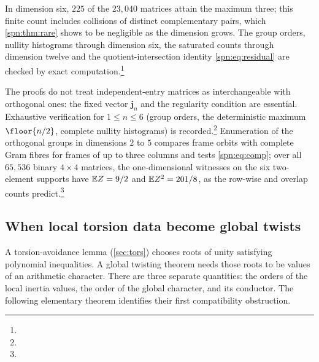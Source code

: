 In dimension six, $225$ of the $23{,}040$ matrices attain the maximum three; this finite count
includes collisions of distinct complementary pairs, which \cref{spn:thm:rare} shows to be
negligible as the dimension grows. The group orders, nullity histograms through dimension six,
the saturated counts through dimension twelve and the quotient-intersection identity
\eqref{spn:eq:residual} are checked by exact
computation.\footnote{\raggedright{}}

The proofs do not treat independent-entry matrices as interchangeable with orthogonal ones: the
fixed vector $\mathbf j_n$ and the regularity condition are essential. Exhaustive verification
for $1\le n\le6$ (group orders, the deterministic maximum $\floor{n/2}$, complete nullity
histograms) is
recorded.\footnote{\raggedright{}}
Enumeration of the orthogonal groups in dimensions $2$ to $5$ compares frame orbits with complete
Gram fibres for frames of up to three columns and tests \eqref{spn:eq:comp}; over all $65{,}536$
binary $4\times4$ matrices, the one-dimensional witnesses on the six two-element supports have
$\mathbb{E} Z=9/2$ and $\mathbb{E} Z^2=201/8$, as the row-wise and overlap counts
predict.\footnote{\raggedright{}}

\subsection{When local torsion data become global twists}\label{spn:sec:characters}

A torsion-avoidance lemma (\cref{sec:tors}) chooses roots of unity satisfying
polynomial inequalities. A global twisting theorem needs those roots to be
values of an arithmetic character. There are three separate quantities: the
orders of the local inertia values, the order of the global character, and
its conductor. The following elementary theorem identifies their first
compatibility obstruction.

